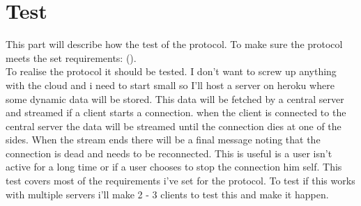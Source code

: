 \documentclass{article}
\begin{document}
\section{Test}\label{sec:test}
This part will describe how the test of the protocol. To make sure the protocol meets the set requirements: (\pageref{sec:requirements}).\\
To realise the protocol it should be tested. I don't want to screw up anything with the cloud and i need to start small so I'll host a server on heroku where some dynamic data will be stored. This data will be fetched by a central server and streamed if a client starts a connection. when the client is connected to the central server the data will be streamed until the connection dies at one of the sides. When the stream ends there will be a final message noting that the connection is dead and needs to be reconnected. This is useful is a user isn't active for a long time or if a user chooses to stop the connection him self. This test covers most of the requirements i've set for the protocol. To test if this works with multiple servers i'll make 2 - 3 clients to test this and make it happen. \\
\end{document}
